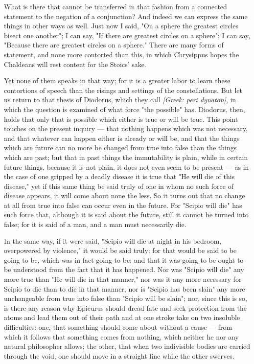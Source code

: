  What is there that cannot be transferred in that fashion from a connected statement to the negation of a conjunction? And indeed we can express the same things in other ways as well. Just now I said, "On a sphere the greatest circles bisect one another"; I can say, "If there are greatest circles on a sphere"; I can say, "Because there are greatest circles on a sphere." There are many forms of statement, and none more contorted than this, in which Chrysippus hopes the Chaldeans will rest content for the Stoics' sake.

 Yet none of them speaks in that way; for it is a greater labor to learn these contortions of speech than the risings and settings of the constellations. But let us return to that thesis of Diodorus, which they call \textit{[Greek: peri dynaton]}, in which the question is examined of what force "the possible" has. Diodorus, then, holds that only that is possible which either is true or will be true. This point touches on the present inquiry — that nothing happens which was not necessary, and that whatever can happen either is already or will be, and that the things which are future can no more be changed from true into false than the things which are past; but that in past things the immutability is plain, while in certain future things, because it is not plain, it does not even seem to be present — as in the case of one gripped by a deadly disease it is true that "He will die of this disease," yet if this same thing be said truly of one in whom no such force of disease appears, it will come about none the less. So it turns out that no change at all from true into false can occur even in the future. For "Scipio will die" has such force that, although it is said about the future, still it cannot be turned into false; for it is said of a man, and a man must necessarily die.

 In the same way, if it were said, "Scipio will die at night in his bedroom, overpowered by violence," it would be said truly; for that would be said to be going to be, which was in fact going to be; and that it was going to be ought to be understood from the fact that it has happened. Nor was "Scipio will die" any more true than "He will die in that manner," nor was it any more necessary for Scipio to die than to die in that manner, nor is "Scipio has been slain" any more unchangeable from true into false than "Scipio will be slain"; nor, since this is so, is there any reason why Epicurus should dread fate and seek protection from the atoms and lead them out of their path and at one stroke take on two insoluble difficulties: one, that something should come about without a cause — from which it follows that something comes from nothing, which neither he nor any natural philosopher allows; the other, that when two indivisible bodies are carried through the void, one should move in a straight line while the other swerves.

